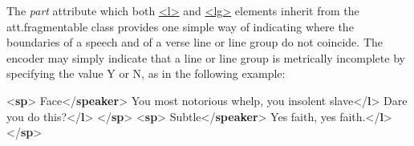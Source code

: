 The {\itshape part} attribute which both \hyperref[TEI.l]{<l>} and \hyperref[TEI.lg]{<lg>} elements inherit from the \textsf{att.fragmentable} class provides one simple way of indicating where the boundaries of a speech and of a verse line or line group do not coincide. The encoder may simply indicate that a line or line group is metrically incomplete by specifying the value Y or N, as in the following example: \par\bgroup{}\exampleFont \begin{shaded}\noindent\mbox{}{<\textbf{sp}>}\mbox{}\newline 
{}Face{</\textbf{speaker}>}\mbox{}\newline 
{}You most\mbox{}\newline 
\hspace*{1em}\hspace*{1em} notorious whelp, you insolent slave{</\textbf{l}>}\mbox{}\newline 
{}Dare you do this?{</\textbf{l}>}\mbox{}\newline 
{</\textbf{sp}>}\mbox{}\newline 
{<\textbf{sp}>}\mbox{}\newline 
{}Subtle{</\textbf{speaker}>}\mbox{}\newline 
{}Yes faith, yes faith.{</\textbf{l}>}\mbox{}\newline 
{</\textbf{sp}>}\mbox{}\newline 

\end{shaded}
